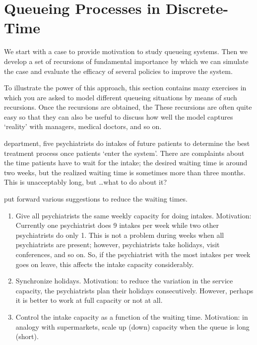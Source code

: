 


\section{Queueing Processes in Discrete-Time}
\label{sec:constr-discr-time}


We start with a case to provide motivation to study queueing systems.
Then we develop a set of recursions of fundamental importance by which we can simulate the case and evaluate the efficacy of several policies to improve the system.

To illustrate the power of this approach, this section contains many  exercises in which you are asked to model different queueing situations by means of such recursions. Once the recursions are obtained, the
These recursions are often quite easy so that they can also be useful to discuss how well the model captures `reality' with managers, medical doctors, and so on.


 department, five psychiatrists do intakes of future patients to determine the best treatment process once patients `enter the system'.
There are complaints about the time patients have to wait for the intake; the desired waiting time is around two weeks, but the realized waiting time is sometimes more than three months.
This is  unacceptably long, but \ldots what to do about it?

  put forward various suggestions to reduce the waiting times.
\begin{enumerate}
\item Give all psychiatrists the same weekly capacity for doing intakes.
  Motivation: Currently one psychiatrist does 9 intakes per week while two other psychiatrists do only 1.
  This is not a problem during weeks when all psychiatrists are present; however, psychiatrists take holidays, visit conferences, and so on.
  So, if the psychiatrist with the most intakes per week goes on leave, this affects the intake capacity considerably.
\item Synchronize holidays.
  Motivation: to reduce the variation in the service capacity, the psychiatrists plan their holidays consecutively.
  However, perhaps it is better to work at full capacity or not at all.
\item Control  the intake capacity as a function of the waiting time.
 Motivation: in analogy with supermarkets,  scale up (down) capacity when the queue is long (short).
\end{enumerate}



